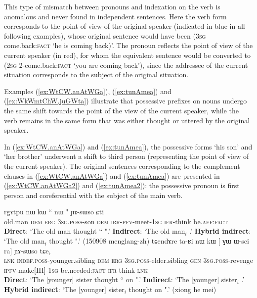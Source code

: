 This type of mismatch between pronouns and indexation on the verb is anomalous and never found in independent sentences. Here the verb form corresponds to the point of view of the original speaker (indicated in blue in all following examples), whose original sentence would have been  (\textsc{3sg} {come.back:\textsc{fact}} `he is coming back)'. The pronoun reflects the point of view of the current speaker (in red), for whom the equivalent sentence would be converted to  (\textsc{2sg} {2-come.back:\textsc{fact}} `you are coming back'), since the addressee of the current situation corresponds to the subject of the original situation.

Examples (\ref{ex:WtCW.anAtWGa}), (\ref{ex:tunAmea}) and (\ref{ex:WkWmtChW.juGWta}) illustrate that possessive prefixes on nouns undergo the same shift towards the point of the view of the current speaker, while the verb remains in the same form that was either thought or uttered by the original speaker.

In (\ref{ex:WtCW.anAtWGa}) and (\ref{ex:tunAmea}), the possessive forms  `his son' and `her brother'  underwent a shift to third person (representing the point of view of the current speaker). The original sentences corresponding to the complement clauses in (\ref{ex:WtCW.anAtWGa}) and (\ref{ex:tunAmea}) are presented in (\ref{ex:WtCW.anAtWGa2}) and (\ref{ex:tunAmea2}): the possessive pronoun is first person and coreferential with the subject of the main verb.
 
\begin{exe}
\ex 
\begin{xlist}
\ex \label{ex:WtCW.anAtWGa}
\gll rgɤtpu nɯ kɯ `` nɯ " ɲɤ-sɯso ɕti \\
old.man \textsc{dem} \textsc{erg} \textsc{3sg}.\textsc{poss}-son \textsc{dem} \textsc{irr}-\textsc{pfv}-meet-\textsc{1sg} \textsc{ifr}-think be.\textsc{aff}:\textsc{fact} \\
\glt  \textbf{Direct}: `The old man thought `` ".'
\glt  \textbf{Indirect}:  `The old man$_i$ .'
\glt  \textbf{Hybrid indirect}:  `The old man$_i$ thought  ".' (150908 menglang-zh)
\ex \label{ex:tunAmea}
\gll tɕendɤre ta-ʁi nɯ kɯ [ ɣɯ ɯ-sci  ra] ɲɤ-sɯso tɕe, \\
\textsc{lnk}  \textsc{indef}.\textsc{poss}-younger.sibling \textsc{dem} \textsc{erg}  {\textsc{3sg}.\textsc{poss}-elder.sibling}  \textsc{gen} \textsc{3sg}.\textsc{poss}-revenge {\textsc{ipfv}-make[III]-\textsc{1sg}} be.needed:\textsc{fact} \textsc{ifr}-think \textsc{lnk} \\
\glt  \textbf{Direct}: `The [younger] sister thought `` on ".'
\glt  \textbf{Indirect}:  `The [younger] sister$_i$ .'
\glt  \textbf{Hybrid indirect}:  `The [younger] sister$_i$ thought  on ".' (xiong he mei)
\end{xlist}
\end{exe} 

